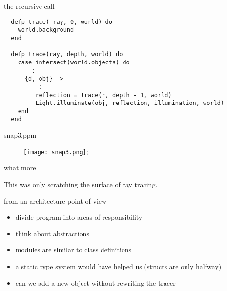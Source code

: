 \begin{frame}[fragile]{the recursive call}

\pause 
\begin{verbatim}
  defp trace(_ray, 0, world) do
    world.background
  end

  defp trace(ray, depth, world) do
    case intersect(world.objects) do
        :
      {d, obj} ->
          :
         reflection = trace(r, depth - 1, world)
         Light.illuminate(obj, reflection, illumination, world)
    end
  end
\end{verbatim}

\end{frame}

\begin{frame}{snap3.ppm}

\begin{figure}
\texttt{[image: snap3.png]};
\end{figure}

\end{frame}


\begin{frame}{what more}

This was only scratching the surface of ray tracing.

\end{frame}

\begin{frame}{from an architecture point of view}

\begin{itemize}
 \pause \item divide program into areas of responsibility
 \pause \item think about abstractions
 \pause \item modules are similar to class definitions
 \pause \item a static type system would have helped us (structs are only halfway)
 \pause \item can we add a new object without rewriting the tracer
\end{itemize}

\end{frame}


